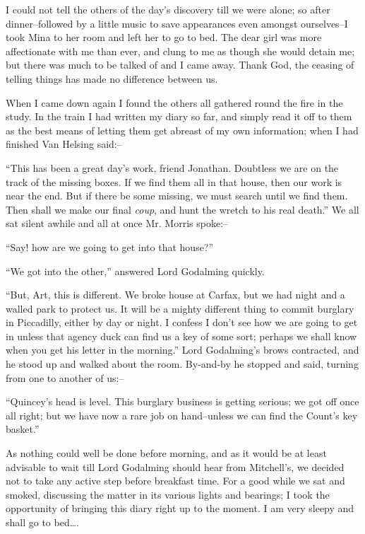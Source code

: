 \documentclass[12pt,openright]{book}
\begin{document}
I could not tell the others of the day’s discovery till we were alone; so after dinner–followed by a little music to save appearances even amongst ourselves–I took Mina to her room and left her to go to bed. The dear girl was more affectionate with me than ever, and clung to me as though she would detain me; but there was much to be talked of and I came away. Thank God, the ceasing of telling things has made no difference between us.

When I came down again I found the others all gathered round the fire in the study. In the train I had written my diary so far, and simply read it off to them as the best means of letting them get abreast of my own information; when I had finished Van Helsing said:–

“This has been a great day’s work, friend Jonathan. Doubtless we are on the track of the missing boxes. If we find them all in that house, then our work is near the end. But if there be some missing, we must search until we find them. Then shall we make our final \textit{coup}, and hunt the wretch to his real death.” We all sat silent awhile and all at once Mr. Morris spoke:–

“Say! how are we going to get into that house?”

“We got into the other,” answered Lord Godalming quickly.

“But, Art, this is different. We broke house at Carfax, but we had night and a walled park to protect us. It will be a mighty different thing to commit burglary in Piccadilly, either by day or night. I confess I don’t see how we are going to get in unless that agency duck can find us a key of some sort; perhaps we shall know when you get his letter in the morning.” Lord Godalming’s brows contracted, and he stood up and walked about the room. By-and-by he stopped and said, turning from one to another of us:–

“Quincey’s head is level. This burglary business is getting serious; we got off once all right; but we have now a rare job on hand–unless we can find the Count’s key basket.”

As nothing could well be done before morning, and as it would be at least advisable to wait till Lord Godalming should hear from Mitchell’s, we decided not to take any active step before breakfast time. For a good while we sat and smoked, discussing the matter in its various lights and bearings; I took the opportunity of bringing this diary right up to the moment. I am very sleepy and shall go to bed….
\end{document}
